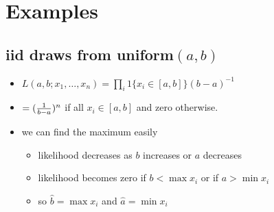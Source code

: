 \section{Examples}

\subsection{iid draws from uniform$(a,b)$}
\begin{itemize}
\item $L(a,b; x_1,\dots,x_n) = \prod_i 1\{x_i \in [a,b]\} (b-a)^{-1}$
\item $= ({1 \over b-a})^{n}$ if all $x_i \in [a,b]$ and zero otherwise.
\item we can find the maximum easily
\begin{itemize}
\item likelihood decreases as $b$ increases or $a$ decreases
\item likelihood becomes zero if $b < \max x_i$ or if $a > \min x_i$
\item so $\hat b = \max x_i$ and $\hat a = \min x_i$
\end{itemize}
\end{itemize}

